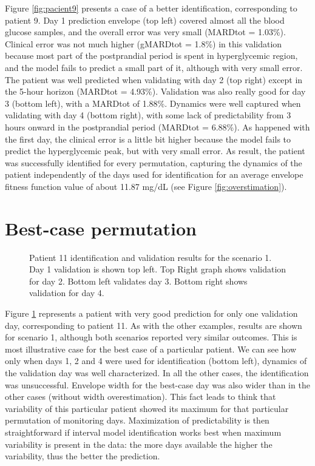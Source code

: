 Figure \ref{fig:pacient9} presents a case of a better identification, corresponding to patient 9. Day 1 prediction envelope (top left) covered almost all the blood glucose samples, and the overall error was very small (MARDtot = 1.03\%). Clinical error was not much higher (gMARDtot = 1.8\%) in this validation because most part of the postprandial period is spent in hyperglycemic region, and the model fails to predict a small part of it, although with very small error. The patient was well predicted when validating with day 2 (top right) except in the 5-hour horizon (MARDtot = 4.93\%). Validation was also really good for day 3 (bottom left), with a MARDtot of 1.88\%. Dynamics were well captured when validating with day 4 (bottom right), with some lack of predictability from 3 hours onward in the postprandial period (MARDtot = 6.88\%). As happened with the first day, the clinical error is a little bit higher because the model fails to predict the hyperglycemic peak, but with very small error. As result, the patient was successfully identified for every permutation, capturing the dynamics of the patient independently of the days used for identification for an average envelope fitness function value of about 11.87 mg/dL (see Figure \ref{fig:overstimation}).

\section{Best-case permutation}
\label{sec:BestCasePermutation}

\begin{figure}[hbtp]
\centering
{}\caption{Patient 11 identification and validation results for the scenario 1. Day 1 validation is shown top left. Top Right graph shows validation for day 2. Bottom left validates day 3. Bottom right shows validation for day 4.}
\label{fig:pacient11}
\end{figure}

Figure \ref{fig:pacient11} represents a patient with very good prediction for only one validation day, corresponding to patient 11. As with the other examples, results are shown for scenario 1, although both scenarios reported very similar outcomes. This is most illustrative case for the best case of a particular patient. We can see how only when days 1, 2 and 4 were used for identification (bottom left), dynamics of the validation day was well characterized. In all the other cases, the identification was unsuccessful. Envelope width for the best-case day was also wider than in the other cases (without width overestimation). This fact leads to think that variability of this particular patient showed its maximum for that particular permutation of monitoring days. Maximization of predictability is then straightforward if interval model identification works best when maximum variability is present in the data: the more days available the higher the variability, thus the better the prediction. 

